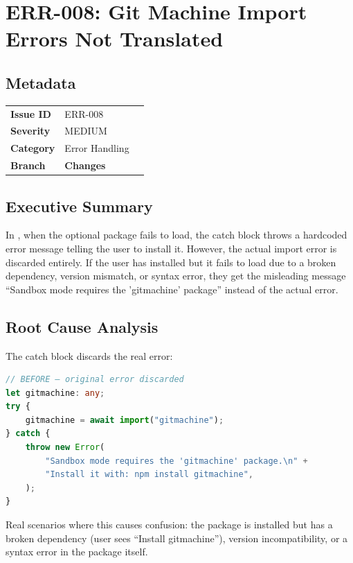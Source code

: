 \section{ERR-008: Git Machine Import Errors Not Translated}
\label{sec:err-008}
\subsection*{Metadata}
\begin{tabular}{ll}
\textbf{Issue ID} & ERR-008 \\
\textbf{Severity} & MEDIUM \\
\textbf{Category} & Error Handling \\
\textbf{Branch} & 
\textbf{Changes} &  \\
\end{tabular}

\subsection*{Executive Summary}
In , when the optional  package fails to load, the catch block throws a hardcoded error message telling the user to install it. However, the actual import error is discarded entirely. If the user has  installed but it fails to load due to a broken dependency, version mismatch, or syntax error, they get the misleading message ``Sandbox mode requires the 'gitmachine' package'' instead of the actual error.

\subsection*{Root Cause Analysis}
The catch block discards the real error:

\begin{lstlisting}[language=TypeScript]
// BEFORE — original error discarded
let gitmachine: any;
try {
    gitmachine = await import("gitmachine");
} catch {
    throw new Error(
        "Sandbox mode requires the 'gitmachine' package.\n" +
        "Install it with: npm install gitmachine",
    );
}
\end{lstlisting}

Real scenarios where this causes confusion: the package is installed but has a broken dependency (user sees ``Install gitmachine''), version incompatibility, or a syntax error in the package itself.

